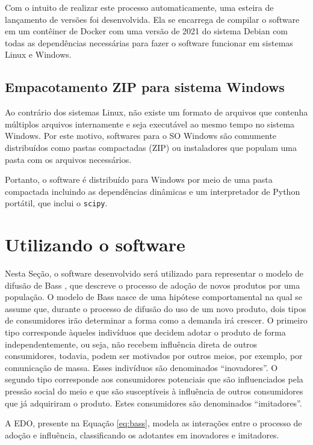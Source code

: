 \documentclass[
	12pt,				%
	openright,			%
	oneside,			%
	a4paper,			%
	main=brazil,
	english,			%
	]{ufsj-abntex2}
\begin{document}
Com o intuito de realizar este processo automaticamente, uma esteira de lançamento de versões foi desenvolvida. Ela se encarrega de compilar o software em um contêiner de Docker \cite{merkel2014docker} com uma versão de 2021 do sistema Debian com todas as dependências necessárias para fazer o software funcionar em sistemas Linux e Windows. 

\subsection{Empacotamento ZIP para sistema Windows}

Ao contrário dos sistemas Linux, não existe um formato de arquivos que contenha múltiplos arquivos internamente e seja executável ao mesmo tempo no sistema Windows. Por este motivo, softwares para o SO Windows são comumente distribuídos como pastas compactadas (ZIP) ou instaladores que populam uma pasta com os arquivos necessários.

Portanto, o software é distribuído para Windows por meio de uma pasta compactada incluindo as dependências dinâmicas e um interpretador de Python portátil, que inclui o \texttt{scipy}.

\section{Utilizando o software}

Nesta Seção, o software desenvolvido será utilizado para representar o modelo de difusão de Bass \cite{Bass1969}, que descreve o processo de adoção de novos produtos por uma população. O modelo de Bass nasce de uma hipótese comportamental na qual se assume que, durante o processo de difusão do uso de um novo produto, dois tipos de consumidores irão determinar a forma como a demanda irá crescer. O primeiro tipo corresponde àqueles indivíduos que decidem
adotar o produto de forma independentemente, ou seja, não recebem influência direta de outros consumidores, todavia, podem ser motivados por outros meios, por exemplo, por comunicação de massa. Esses indivíduos são denominados ``inovadores''. O segundo tipo corresponde aos consumidores potenciais que são influenciados pela pressão social do meio e que são susceptíveis à influência de outros consumidores que já adquiriram o produto. Estes consumidores são denominados ``imitadores''. 

A EDO, presente na Equação \ref{eq:bass}, modela as interações entre o processo de adoção e influência, classificando os adotantes em inovadores e imitadores.
\end{document}
